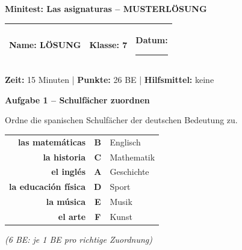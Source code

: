 \documentclass[11pt, a4paper]{article}
\newcommand{\fachfarbe}{spanisch}
\newcommand{\thema}{Minitest: Las asignaturas -- MUSTERLÖSUNG}
\newcommand{\klasse}{7}
\newcommand{\maxpunkte}{26}
\newcommand{\zeit}{15 Minuten}
\newcommand{\punktebox}[1]{\hfill\fbox{\small \_\_\_/#1}}
\newcommand{\luecke}[1]{\rule{#1}{0.4pt}}
\newcommand{\lsg}[1]{\textcolor{loesung}{\textbf{#1}}}
\newenvironment{aufgabe}[1]{%
    \vspace{12pt}
    \noindent\textbf{\textcolor{\fachfarbe}{Aufgabe #1}}
    \vspace{6pt}
    \begin{list}{}{\leftmargin=0pt}
    \item[]
}{%
    \end{list}
}
\newcommand{\es}[1]{\textcolor{\fachfarbe}{\textbf{#1}}}
\begin{document}

\begin{center}
    {\Large\bfseries\textcolor{loesung}{\thema}}
\end{center}

\vspace{5pt}

\noindent
\begin{tabularx}{\textwidth}{|X|X|X|}
\hline
\textbf{Name:} \lsg{LÖSUNG} &
\textbf{Klasse:} \klasse &
\textbf{Datum:} \luecke{2cm} \\
\hline
\end{tabularx}

\vspace{10pt}

\begin{infobox}
\textbf{Zeit:} \zeit{} | \textbf{Punkte:} \maxpunkte{} BE | \textbf{Hilfsmittel:} keine
\end{infobox}

\vspace{15pt}


\begin{aufgabe}{1 -- Schulfächer zuordnen}
Ordne die spanischen Schulfächer der deutschen Bedeutung zu. \punktebox{6}
\end{aufgabe}

\begin{center}
\begin{tabular}{rcl}
\es{las matemáticas} & \lsg{B} & Englisch \\[0.8em]
\es{la historia} & \lsg{C} & Mathematik \\[0.8em]
\es{el inglés} & \lsg{A} & Geschichte \\[0.8em]
\es{la educación física} & \lsg{D} & Sport \\[0.8em]
\es{la música} & \lsg{E} & Musik \\[0.8em]
\es{el arte} & \lsg{F} & Kunst \\
\end{tabular}
\end{center}

\textcolor{loesung}{\textit{(6 BE: je 1 BE pro richtige Zuordnung)}}
\end{document}
